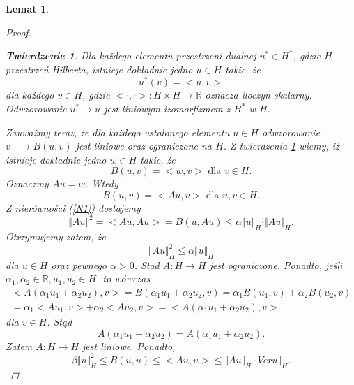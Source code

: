 \documentclass[12pt,a4paper,oneside,titlepage]{article}
\newtheorem{Twierdzenie}{Twierdzenie}
\newtheorem{Lemat}{Lemat}
\begin{document}
\begin{Lemat}
\begin{proof}
\begin{Twierdzenie} \label{TR}
Dla każdego elementu przestrzeni dualnej $u^* \in H^*$, gdzie $H-$ przestrzeń Hilberta, istnieje dokładnie jedno $u \in H$ takie, że
\begin{equation}
\nonumber
u^* (v) = <u,v>
\end{equation}
dla każdego $v \in H$, gdzie $<\cdot, \cdot >:H \times H \rightarrow \mathbb{R}$ oznacza iloczyn skalarny. Odwzorowanie $u^* \rightarrow u$ jest liniowym izomorfizmem z $H^*$ w $H$.
\end{Twierdzenie}
Zauważmy teraz, że dla każdego ustalonego elementu $u \in H$ odwzorowanie $v -\rightarrow B(u,v) $ jest liniowe oraz ograniczone na $H$. Z twierdzenia \ref{TR} wiemy, iż istnieje dokładnie jedno $w \in H$ takie, że
\begin{equation}
\nonumber
B(u,v) = <w,v> \text{ dla } v \in H.
\end{equation}
Oznaczmy $Au=w$. Wtedy
\begin{equation}
B(u,v) = <Au,v> \text{ dla } u,v \in H.
\end{equation}
Z nierówności (\ref{N1}) dostajemy
\begin{equation}
\nonumber
\Vert Au \Vert^2 = <Au,Au> = B(u,Au) \leq \alpha \Vert u \Vert_H \cdot \Vert Au \Vert_H.
\end{equation}
Otrzymujemy zatem, że
\begin{equation}
\nonumber
\Vert Au \Vert_H^2 \leq \alpha \Vert u \Vert_H
\end{equation}
dla $u \in H$ oraz pewnego $\alpha >0$. Stad $A:H \rightarrow H$ jest ograniczone.
Ponadto, jeśli $\alpha_1, \alpha_2 \in \mathbb{R}, u_1, u_2 \in H$, to wówczas
\begin{equation}
\nonumber
\begin{split}
<A(\alpha_1 u_1 +\alpha_2 u_2), v > = B(\alpha_1 u_1 +\alpha_2 u_2, v)  = \alpha_1 B(u_1, v) + \alpha_2 B(u_2,v) \\ = \alpha_1 <Au_1,v> + \alpha_2 <Au_2,v> = <A(\alpha_1 u_1 +\alpha_2 u_2), v >
\end{split}
\end{equation}
dla $v \in H$. Stąd
\begin{equation}
\nonumber
A(\alpha_1 u_1 +\alpha_2 u_2) = A(\alpha_1 u_1 +\alpha_2 u_2).
\end{equation}
Zatem $A:H \rightarrow H$ jest liniowe.
Ponadto,
\begin{equation}
\nonumber
\beta \Vert u \Vert_H^2 \leq B(u,u) \leq <Au,u> \leq \Vert Au \Vert_H \cdot Ver
 u \Vert_H . 

\end{equation}
\end{proof}
\end{Lemat}
\end{document}

